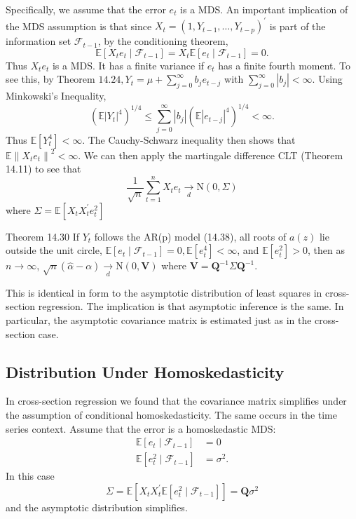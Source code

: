 \documentclass[10pt]{article}
\begin{document}
Specifically, we assume that the error $e_{t}$ is a MDS. An important implication of the MDS assumption is that since $X_{t}=\left(1, Y_{t-1}, \ldots, Y_{t-p}\right)^{\prime}$ is part of the information set $\mathscr{F}_{t-1}$, by the conditioning theorem,
$$
\mathbb{E}\left[X_{t} e_{t} \mid \mathscr{F}_{t-1}\right]=X_{t} \mathbb{E}\left[e_{t} \mid \mathscr{F}_{t-1}\right]=0 .
$$
Thus $X_{t} e_{t}$ is a MDS. It has a finite variance if $e_{t}$ has a finite fourth moment. To see this, by Theorem $14.24, Y_{t}=\mu+\sum_{j=0}^{\infty} b_{j} e_{t-j}$ with $\sum_{j=0}^{\infty}\left|b_{j}\right|<\infty$. Using Minkowski's Inequality,
$$
\left(\mathbb{E}\left|Y_{t}\right|^{4}\right)^{1 / 4} \leq \sum_{j=0}^{\infty}\left|b_{j}\right|\left(\mathbb{E}\left|e_{t-j}\right|^{4}\right)^{1 / 4}<\infty .
$$
Thus $\mathbb{E}\left[Y_{t}^{4}\right]<\infty$. The Cauchy-Schwarz inequality then shows that $\mathbb{E}\left\|X_{t} e_{t}\right\|^{2}<\infty$. We can then apply the martingale difference CLT (Theorem 14.11) to see that
$$
\frac{1}{\sqrt{n}} \sum_{t=1}^{n} X_{t} e_{t} \underset{d}{\longrightarrow} \mathrm{N}(0, \Sigma)
$$
where $\Sigma=\mathbb{E}\left[X_{t} X_{t}^{\prime} e_{t}^{2}\right]$

Theorem 14.30 If $Y_{t}$ follows the AR(p) model (14.38), all roots of $a(z)$ lie outside the unit circle, $\mathbb{E}\left[e_{t} \mid \mathscr{F}_{t-1}\right]=0, \mathbb{E}\left[e_{t}^{4}\right]<\infty$, and $\mathbb{E}\left[e_{t}^{2}\right]>0$, then as $n \rightarrow \infty$, $\sqrt{n}(\widehat{\alpha}-\alpha) \underset{d}{\rightarrow} \mathrm{N}(0, \boldsymbol{V})$ where $\boldsymbol{V}=\boldsymbol{Q}^{-1} \Sigma \boldsymbol{Q}^{-1}$.

This is identical in form to the asymptotic distribution of least squares in cross-section regression. The implication is that asymptotic inference is the same. In particular, the asymptotic covariance matrix is estimated just as in the cross-section case.

\subsection{Distribution Under Homoskedasticity}
In cross-section regression we found that the covariance matrix simplifies under the assumption of conditional homoskedasticity. The same occurs in the time series context. Assume that the error is a homoskedastic MDS:
$$
\begin{aligned}
\mathbb{E}\left[e_{t} \mid \mathscr{F}_{t-1}\right] &=0 \\
\mathbb{E}\left[e_{t}^{2} \mid \mathscr{F}_{t-1}\right] &=\sigma^{2} .
\end{aligned}
$$
In this case
$$
\Sigma=\mathbb{E}\left[X_{t} X_{t}^{\prime} \mathbb{E}\left[e_{t}^{2} \mid \mathscr{F}_{t-1}\right]\right]=\boldsymbol{Q} \sigma^{2}
$$
and the asymptotic distribution simplifies.
\end{document}
